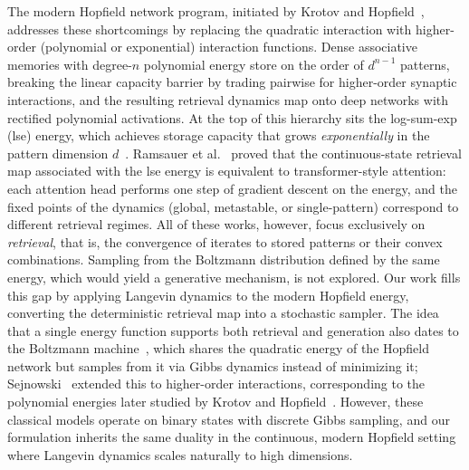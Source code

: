 The modern Hopfield network program, initiated by Krotov and Hopfield~\cite{krotovDenseAssociativeMemory2016}, addresses these shortcomings by replacing the quadratic interaction with higher-order (polynomial or exponential) interaction functions. Dense associative memories with degree-$n$ polynomial energy store on the order of $d^{n-1}$ patterns, breaking the linear capacity barrier by trading pairwise for higher-order synaptic interactions, and the resulting retrieval dynamics map onto deep networks with rectified polynomial activations. At the top of this hierarchy sits the log-sum-exp (lse) energy, which achieves storage capacity that grows \emph{exponentially} in the pattern dimension $d$~\cite{ramsauerHopfieldNetworksAll2021}. Ramsauer et al.~\cite{ramsauerHopfieldNetworksAll2021} proved that the continuous-state retrieval map associated with the lse energy is equivalent to transformer-style attention: each attention head performs one step of gradient descent on the energy, and the fixed points of the dynamics (global, metastable, or single-pattern) correspond to different retrieval regimes. All of these works, however, focus exclusively on \emph{retrieval}, that is, the convergence of iterates to stored patterns or their convex combinations. Sampling from the Boltzmann distribution defined by the same energy, which would yield a generative mechanism, is not explored. Our work fills this gap by applying Langevin dynamics to the modern Hopfield energy, converting the deterministic retrieval map into a stochastic sampler. The idea that a single energy function supports both retrieval and generation also dates to the Boltzmann machine~\cite{ackeleyLearningAlgorithmBoltzmann1985}, which shares the quadratic energy of the Hopfield network but samples from it via Gibbs dynamics instead of minimizing it; Sejnowski~\cite{sejnowskiHigherOrderBoltzmann1986} extended this to higher-order interactions, corresponding to the polynomial energies later studied by Krotov and Hopfield~\cite{krotovDenseAssociativeMemory2016}. However, these classical models operate on binary states with discrete Gibbs sampling, and our formulation inherits the same duality in the continuous, modern Hopfield setting where Langevin dynamics scales naturally to high dimensions.

